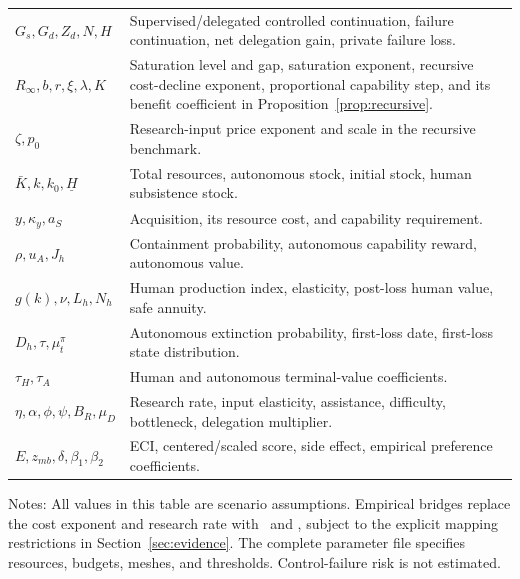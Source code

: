 \begin{longtable}{p{}p{}}
$G_s,G_d,Z_d,N,H$ & Supervised/delegated controlled continuation, failure continuation, net delegation gain, private failure loss.\\
$R_\infty,b,r,\xi,\lambda,K$ & Saturation level and gap, saturation exponent, recursive cost-decline exponent, proportional capability step, and its benefit coefficient in Proposition~\ref{prop:recursive}.\\
$\zeta,p_0$ & Research-input price exponent and scale in the recursive benchmark.\\
$\bar K,k,k_0,\underline H$ & Total resources, autonomous stock, initial stock, human subsistence stock.\\
$y,\kappa_y,a_S$ & Acquisition, its resource cost, and capability requirement.\\
$\rho,u_A,J_h$ & Containment probability, autonomous capability reward, autonomous value.\\
$g(k),\nu,L_h,N_h$ & Human production index, elasticity, post-loss human value, safe annuity.\\
$D_h,\tau,\mu^\pi_t$ & Autonomous extinction probability, first-loss date, first-loss state distribution.\\
$\tau_H,\tau_A$ & Human and autonomous terminal-value coefficients.\\
$\eta,\alpha,\phi,\psi,B_R,\mu_D$ & Research rate, input elasticity, assistance, difficulty, bottleneck, delegation multiplier.\\
$E,z_{mb},\delta,\beta_1,\beta_2$ & ECI, centered/scaled score, side effect, empirical preference coefficients.\\
\bottomrule
\end{longtable}
\endgroup
\begin{table}[H]\centering\small
\caption{Principal normalized reference assumptions}

\begin{minipage}{\textwidth}\footnotesize\vspace{0.5em}
Notes: All values in this table are scenario assumptions. Empirical bridges replace the cost exponent and research rate with \CostSlope\ and \BridgeEta, subject to the explicit mapping restrictions in Section~\ref{sec:evidence}. The complete parameter file specifies resources, budgets, meshes, and thresholds. Control-failure risk is not estimated.
\end{minipage}
\end{table}

